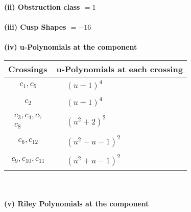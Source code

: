 \documentclass[1p]{elsarticle_modified}
\theoremstyle{definition}
\begin{document}
\flushleft \textbf{(ii) Obstruction class $= 1$}\\~\\
\flushleft \textbf{(iii) Cusp Shapes $= -16$}\\~\\
\newpage\renewcommand{\arraystretch}{1}
\flushleft \textbf{(iv) u-Polynomials at the component}\newline \\
\begin{tabular}{m{50pt}|m{274pt}}
Crossings & \hspace{64pt}u-Polynomials at each crossing \\
\hline $$\begin{aligned}c_{1},c_{5}\end{aligned}$$&$\begin{aligned}
&(u-1)^4
\end{aligned}$\\
\hline $$\begin{aligned}c_{2}\end{aligned}$$&$\begin{aligned}
&(u+1)^4
\end{aligned}$\\
\hline $$\begin{aligned}c_{3},c_{4},c_{7}\\c_{8}\end{aligned}$$&$\begin{aligned}
&(u^2+2)^2
\end{aligned}$\\
\hline $$\begin{aligned}c_{6},c_{12}\end{aligned}$$&$\begin{aligned}
&(u^2- u-1)^2
\end{aligned}$\\
\hline $$\begin{aligned}c_{9},c_{10},c_{11}\end{aligned}$$&$\begin{aligned}
&(u^2+u-1)^2
\end{aligned}$\\
\hline
\end{tabular}\\~\\
\newpage\renewcommand{\arraystretch}{1}
\flushleft \textbf{(v) Riley Polynomials at the component}\newline \\
\end{document}

